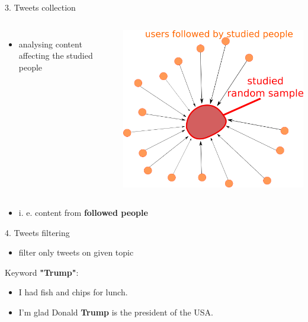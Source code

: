 \documentclass{beamer}
\newcommand{\cmark}{\ding{51}} %
\newcommand{\xmark}{\ding{55}} %
\begin{document}
\begin{frame}[fragile]
\begin{columns}[T]
\begin{column}{.33\textwidth}
\begin{blankblock}{3. Tweets collection}
\begin{columns}
\begin{itemize}
            \item analysing content affecting the studied people
    	\end{itemize}
    	\center
    	\includegraphics[scale=0.65]{./Pics/followers.png}
    \end{columns}
    \vspace{0.8cm}
    \begin{itemize}
        \item i. e. content from \textbf{followed people}
    \end{itemize}
\end{blankblock}
\begin{blankblock}{4. Tweets filtering}
\begin{itemize}
    \item filter only tweets on given topic
\end{itemize}
\vspace{0.3cm}
Keyword \textbf{"Trump"}:
\vspace{1cm}
\begin{itemize}\centering
    \item[\textcolor{black}{\xmark}] I had fish and chips for lunch.
    \item[\textcolor{black}{\cmark}] I'm glad Donald \textbf{Trump} is the president of the USA.

\end{itemize}
\end{blankblock}
\end{column}
\end{columns}
\end{frame}
\end{document}

